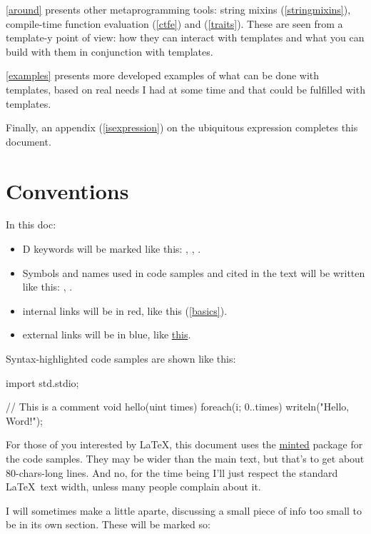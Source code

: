\autoref{around} presents other meta\-pro\-gram\-ming tools: string mixins (\ref{stringmixins}), compile-time function evaluation (\ref{ctfe}) and  (\ref{traits}). These are seen from a template-y point of view: how they can interact with templates and what you can build with them in conjunction with templates.

\autoref{examples} presents more developed examples of what can be done with templates, based on real needs I had at some time and that could be fulfilled with templates.

Finally, an appendix (\autoref{isexpression}) on the ubiquitous  expression  completes this document.

\section*{Conventions}

In this doc:

\begin{itemize}
\item D keywords will be marked like this: , , .
\item Symbols and names used in code samples and cited in the text will be written like this: , .
\item internal links will be in red, like this (\ref{basics}).
\item external links will be in blue, like \href{http://www.dlang.org}{this}.
\end{itemize}

Syntax-highlighted code samples are shown like this:

\begin{dcode}
import std.stdio;

// This is a comment
void hello(uint times)
{
    foreach(i; 0..times) writeln("Hello, Word!");
}
\end{dcode}

For those of you interested by \LaTeX, this document uses the \href{http://code.google.com/p/minted/}{minted} package for the code samples. They may be wider than the main text, but that's to get about 80-chars-long lines. And no, for the time being I'll just respect the standard \LaTeX\ text width, unless many people complain about it.

I will sometimes make a little aparte, discussing a small piece of info too small to be in its own section. These will be marked so:

